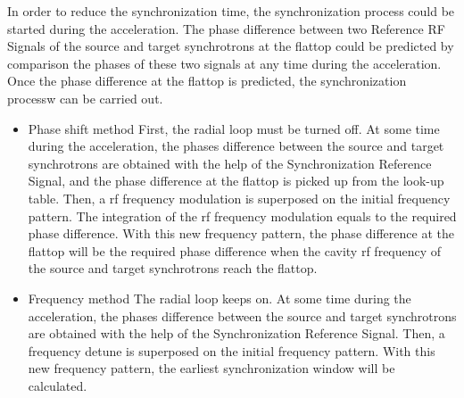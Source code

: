 In order to reduce the synchronization time, the synchronization process could be started during the acceleration. The phase
difference between two Reference RF Signals of the source and target synchrotrons at the flattop could be predicted by comparison the phases of these two signals at any time during the acceleration. Once the phase difference at the flattop is predicted, the synchronization processw can be carried out. 
\begin{itemize}
	\item Phase shift method
First, the radial loop must be turned off. At some time during the acceleration, the phases difference between the source and target synchrotrons are obtained with the help of the Synchronization Reference Signal, and the phase difference at the flattop is picked up from the look-up table. Then, a rf frequency modulation is superposed on the initial frequency pattern. The integration of the rf frequency modulation equals to the required phase difference. With this new frequency pattern, the phase difference at the flattop will be the required phase difference when the cavity rf frequency of the source and target synchrotrons reach the flattop. 
	\item Frequency method
The radial loop keeps on. At some time during the acceleration, the phases difference between the source and target synchrotrons are obtained with the help of the Synchronization Reference Signal. Then, a frequency detune is superposed on the initial frequency pattern. With this new frequency pattern, the earliest synchronization window will be calculated. 
\end{itemize}